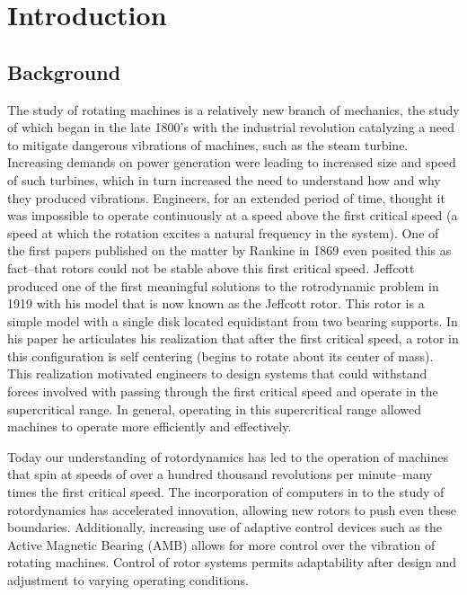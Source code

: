 \chapter{Introduction}
\section{Background} 
The study of rotating machines is a relatively new branch of mechanics, the study of which began in the late 1800's with the industrial revolution catalyzing a need to mitigate dangerous vibrations of machines, such as the steam turbine. Increasing demands on power generation were leading to increased size and speed of such turbines, which in turn increased the need to understand how and why they produced vibrations. Engineers, for an extended period of time, thought it was impossible to operate continuously at a speed above the first critical speed (a speed at which the rotation excites a natural frequency in the system). One of the first papers published on the matter by Rankine in 1869 even posited this as fact--that rotors could not be stable above this first critical speed. Jeffcott produced one of the first meaningful solutions to the rotrodynamic problem in 1919 with his model that is now known as the Jeffcott rotor. This rotor is a simple model with a single disk located equidistant from two bearing supports. In his paper he articulates his realization that after the first critical speed, a rotor in this configuration is self centering (begins to rotate about its center of mass). This realization motivated engineers to design systems that could withstand forces involved with passing through the first critical speed and operate in the supercritical range. In general, operating in this supercritical range allowed machines to operate more efficiently and effectively.\par 
Today our understanding of rotordynamics has led to the operation of  machines that spin at speeds of over a hundred thousand revolutions per minute--many times the first critical speed. The incorporation of computers in to the study of rotordynamics has accelerated innovation, allowing new rotors to push even these boundaries. Additionally, increasing use of adaptive control devices such as the Active Magnetic Bearing (AMB) allows for more control over the vibration of rotating machines. Control of rotor systems permits adaptability after design and adjustment to varying operating conditions. \par
